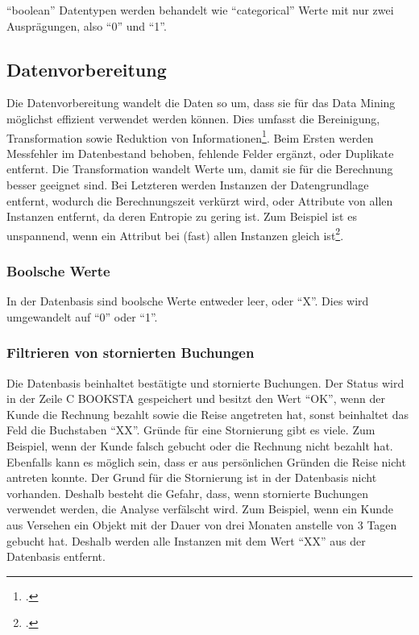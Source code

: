 "`boolean"' Datentypen werden behandelt wie "`categorical"' Werte mit nur zwei Ausprägungen, also "`0"' und "`1"'.

\subsection{Datenvorbereitung}
\label{sec:recherche:datenvorbereitung}
Die Datenvorbereitung wandelt die Daten so um, dass sie für das Data Mining möglichst effizient verwendet werden können. Dies umfasst die Bereinigung, Transformation sowie Reduktion von Informationen\footcite{feature_selection_2017-01-04}. Beim Ersten werden Messfehler im Datenbestand behoben, fehlende Felder ergänzt, oder Duplikate entfernt. Die Transformation wandelt Werte um, damit sie für die Berechnung besser geeignet sind. Bei Letzteren werden Instanzen der Datengrundlage entfernt, wodurch die Berechnungszeit verkürzt wird, oder Attribute von allen Instanzen entfernt, da deren Entropie zu gering ist. Zum Beispiel ist es unspannend, wenn ein Attribut bei (fast) allen Instanzen gleich ist\footcite{data_mining_concepts_and_techniques}. 

\subsubsection{Boolsche Werte}  
\label{sec:recherche:datenvorbereitung:boolschewerte}
In der Datenbasis sind boolsche Werte entweder leer, oder "`X"'. Dies wird umgewandelt auf "`0"' oder "`1"'.

\subsubsection{Filtrieren von stornierten Buchungen}
\label{sec:recherche:datenvorbereitung:filtrieren}
Die Datenbasis beinhaltet bestätigte und stornierte Buchungen. Der Status wird in der Zeile C BOOKSTA gespeichert und besitzt den Wert "`OK"', wenn der Kunde die Rechnung bezahlt sowie die Reise angetreten hat, sonst beinhaltet das Feld die Buchstaben "`XX"'. Gründe für eine Stornierung gibt es viele. Zum Beispiel, wenn der Kunde falsch gebucht oder die Rechnung nicht bezahlt hat. Ebenfalls kann es möglich sein, dass er aus persönlichen Gründen die Reise nicht antreten konnte.
Der Grund für die Stornierung ist in der Datenbasis nicht vorhanden. Deshalb besteht die Gefahr, dass, wenn stornierte Buchungen verwendet werden, die Analyse verfälscht wird. Zum Beispiel, wenn ein Kunde aus Versehen ein Objekt mit der Dauer von drei Monaten anstelle von 3 Tagen gebucht hat. Deshalb werden alle Instanzen mit dem Wert "`XX"' aus der Datenbasis entfernt.

